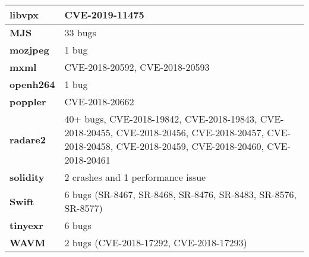 \begin{longtable}{| p{} | p{} |}
\textbf{libvpx}         & CVE-2019-11475
	\\ \hline
\textbf{MJS}            & 33 bugs                                                                                                                                                                                            \\ \hline
\textbf{mozjpeg}        & 1 bug                                                                                                                                                                                              \\ \hline
\textbf{mxml}           & CVE-2018-20592, CVE-2018-20593                                                                                                                                                                     \\ \hline
\textbf{openh264}       & 1 bug                                                                                                                                                                                              \\ \hline
\textbf{poppler}        & CVE-2018-20662                                                                                                                                                                                     \\ \hline
\textbf{radare2}        & 40+ bugs, CVE-2018-19842, CVE-2018-19843, CVE-2018-20455, CVE-2018-20456, CVE-2018-20457, CVE-2018-20458, CVE-2018-20459, CVE-2018-20460, CVE-2018-20461 \\ \hline
\textbf{solidity}       & 2 crashes and 1 performance issue                                                                                                                                                                  \\ \hline
\textbf{Swift}          & 6 bugs (SR-8467, SR-8468, SR-8476, SR-8483, SR-8576, SR-8577)                                                                                                                                      \\ \hline
\textbf{tinyexr}        & 6 bugs                                                                                                                                                                                             \\ \hline
\textbf{WAVM}           & 2 bugs (CVE-2018-17292, CVE-2018-17293)                                                                                                                                                            \\ \hline

\end{longtable}

